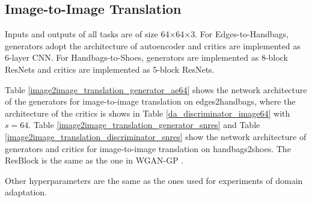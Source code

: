 \documentclass[runningheads]{llncs}
\begin{document}
\subsection{Image-to-Image Translation}
\label{hyperparameters_image_translation}

Inputs and outputs of all tasks are of size 64$\times$64$\times$3. 	
For Edges-to-Handbags, 
generators adopt the architecture of autoencoder \cite{autoencoder} and 
critics are implemented as 6-layer CNN. 
For Handbags-to-Shoes, 
generators are implemented as 8-block ResNets and 
critics are implemented as 5-block ResNets. 

Table \ref{image2image_translation_generator_ae64} shows the network architecture of the generators for image-to-image translation on edges2handbags, where the architecture of the critics is shows in Table \ref{da_discriminator_image64} with $s=64$.
Table \ref{image2image_translation_generator_snres} and Table \ref{image2image_translation_discriminator_snres} show the network architecture of generators and critics for image-to-image translation on handbags2shoes. The ResBlock is the same as the one in WGAN-GP \cite{wgangp}. 

Other hyperparameters are the same as the ones used for experiments of domain adaptation.
\end{document}
